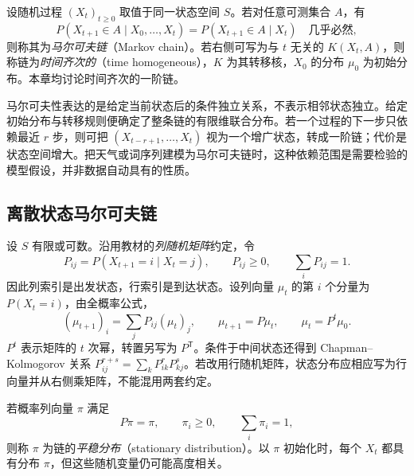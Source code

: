\begin{definition}[马尔可夫链与时间齐次性]
\label{def:lh-mcmc-markov}
设随机过程 $(X_t)_{t\geq0}$ 取值于同一状态空间 $S$。若对任意可测集合 $A$，有
\begin{equation}
P(X_{t+1}\in A\mid X_0,\ldots,X_t)
=P(X_{t+1}\in A\mid X_t)\quad\text{几乎必然},
\label{eq:lh-mcmc-markov-property}
\end{equation}
则称其为\emph{马尔可夫链}（Markov chain）。若右侧可写为与 $t$ 无关的 $K(X_t,A)$，则称链为\emph{时间齐次的}（time homogeneous），$K$ 为其转移核，$X_0$ 的分布 $\mu_0$ 为初始分布。本章均讨论时间齐次的一阶链。
\end{definition}

马尔可夫性表达的是给定当前状态后的条件独立关系，不表示相邻状态独立。给定初始分布与转移规则便确定了整条链的有限维联合分布。若一个过程的下一步只依赖最近 $r$ 步，则可把 $(X_{t-r+1},\ldots,X_t)$ 视为一个增广状态，转成一阶链；代价是状态空间增大。把天气或词序列建模为马尔可夫链时，这种依赖范围是需要检验的模型假设，并非数据自动具有的性质。

\subsection{离散状态马尔可夫链}
\label{subsec:lh-mcmc-discrete-chain}

设 $S$ 有限或可数。沿用教材的\emph{列随机矩阵}约定，令
\begin{equation}
P_{ij}=P(X_{t+1}=i\mid X_t=j),\qquad
P_{ij}\geq0,\qquad\sum_iP_{ij}=1.
\label{eq:lh-mcmc-column-matrix}
\end{equation}
因此列索引是出发状态，行索引是到达状态。设列向量 $\mu_t$ 的第 $i$ 个分量为 $P(X_t=i)$，由全概率公式，
\begin{equation}
(\mu_{t+1})_i=\sum_jP_{ij}(\mu_t)_j,
\qquad\mu_{t+1}=P\mu_t,\qquad\mu_t=P^t\mu_0.
\label{eq:lh-mcmc-distribution-evolution}
\end{equation}
$P^t$ 表示矩阵的 $t$ 次幂，转置另写为 $P^{\mathsf T}$。条件于中间状态还得到 Chapman--Kolmogorov 关系 $P^{r+s}_{ij}=\sum_kP^r_{ik}P^s_{kj}$。若改用行随机矩阵，状态分布应相应写为行向量并从右侧乘矩阵，不能混用两套约定。

\begin{definition}[平稳分布]
\label{def:lh-mcmc-stationarity}
若概率列向量 $\pi$ 满足
\begin{equation}
P\pi=\pi,\qquad\pi_i\geq0,\qquad\sum_i\pi_i=1,
\label{eq:lh-mcmc-stationary-system}
\end{equation}
则称 $\pi$ 为链的\emph{平稳分布}（stationary distribution）。以 $\pi$ 初始化时，每个 $X_t$ 都具有分布 $\pi$，但这些随机变量仍可能高度相关。
\end{definition}

